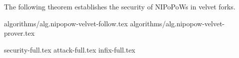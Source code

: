 The following theorem establishes the security of NIPoPoWs in velvet forks.


{algorithms/alg.nipopow-velvet-follow.tex}
{algorithms/alg.nipopow-velvet-prover.tex}

{security-full.tex}
{attack-full.tex}
{infix-full.tex}

%
